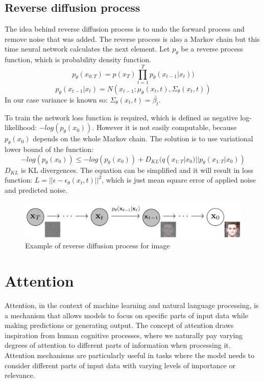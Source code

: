 \documentclass[11pt,a4paper]{report}
\begin{document}
\subsection{Reverse diffusion process}
The idea behind reverse diffusion process is to undo the forward process and remove noise that was added. The reverse process is  also a Markov chain but this time neural network calculates the next element. Let $p_\theta$ be a reverse process function, which is probability density function.
\[p_\theta(x_{0:T}) = p(x_T)\prod_{t=1}^{T}{p_\theta(x_{t-1}|x_t)})\]
\[p_\theta(x_{t-1}|x_t) = N(x_{t-1};\mu_\theta(x_t, t), \Sigma_\theta(x_t,t))\]
In our case variance is known so: $\Sigma_\theta(x_t,t)=\bar{\beta_t}$.

To train the network loss function is required, which is defined as negative \break log-likelihood: $-log(p_\theta(x_0))$. However it is not easily computable, because $p_\theta(x_0)$ depends on the whole Markov chain. The solution is to use variational lower bound of the function:
\[-log(p_\theta(x_0)) \le -log(p_\theta(x_0)) + D_{KL}(q(x_{1:T}|x_0)||p_\theta(x_{1:T}|x_0))\]
$D_{KL}$ is KL divergences. The equation can be simplified \cite{ImprovedDDPM} and it will result in loss function: $L=||\epsilon - \epsilon_\theta(x_t, t)||^2$, which is just mean square error of applied noise and predicted noise.

\begin{figure}[H]
	\centering
	\includegraphics[width=\textwidth]{images/reverse-diffusion}
    \caption{Example of reverse diffusion process for image \cite{DDPM}}
\end{figure}

\section{Attention}
Attention, in the context of machine learning and natural language processing, is a mechanism that allows models to focus on specific parts of input data while making predictions or generating output. The concept of attention draws inspiration from human cognitive processes, where we naturally pay varying degrees of attention to different parts of information when processing it. Attention mechanisms are particularly useful in tasks where the model needs to consider different parts of input data with varying levels of importance or relevance.
\end{document}
